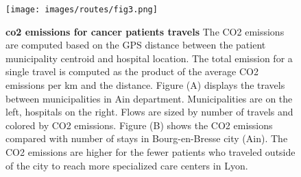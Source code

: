 \begin{figure}[H]
    \texttt{[image: images/routes/fig3.png]}
    \centering
    \caption{
        \textbf{\ac{co2} emissions for cancer patients travels} The CO2 emissions are computed based on the GPS distance between the patient municipality centroid and hospital location. The total emission for a single travel is computed as the product of the average CO2 emissions per km and the distance. Figure (A) displays the travels between municipalities in Ain department. Municipalities are on the left, hospitals on the right. Flows are sized by number of travels and colored by CO2 emissions. Figure (B) shows the CO2 emissions compared with number of stays in Bourg-en-Bresse city (Ain). The CO2 emissions are higher for the fewer patients who traveled outside of the city to reach more specialized care centers in Lyon.
    }
    \label{fig:routes-co2-emissions}
\end{figure}
